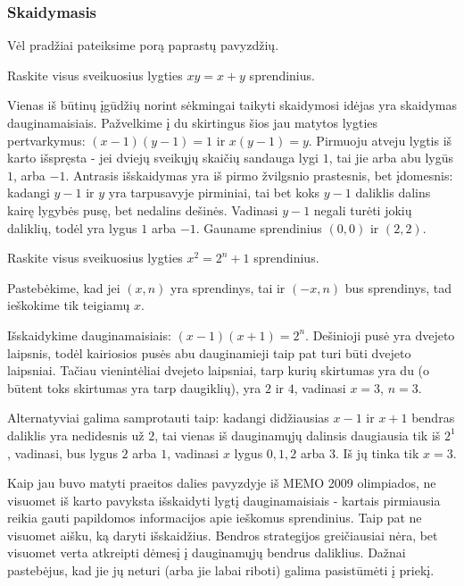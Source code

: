 \subsubsection{Skaidymasis}

Vėl pradžiai pateiksime porą paprastų pavyzdžių.

\begin{pav} Raskite visus sveikuosius lygties $xy = x + y$ sprendinius.
\end{pav}

\begin{sprendimas}
  Vienas iš būtinų įgūdžių norint sėkmingai taikyti skaidymosi idėjas
  yra skaidymas dauginamaisiais. Pažvelkime į du skirtingus šios jau
  matytos lygties
  pertvarkymus: $(x-1)(y-1) = 1$ ir $x(y-1) = y$. Pirmuoju atveju lygtis iš
  karto išspręsta - jei dviejų sveikųjų skaičių sandauga lygi $1$, tai jie
  arba abu lygūs $1$, arba $-1$. Antrasis išskaidymas yra iš pirmo žvilgsnio
  prastesnis, bet įdomesnis: kadangi $y-1$ ir $y$ yra tarpusavyje
  pirminiai, tai bet koks $y-1$ daliklis dalins kairę lygybės pusę, bet
  nedalins dešinės. Vadinasi $y-1$ negali turėti jokių daliklių, todėl
  yra lygus $1$ arba $-1$. Gauname sprendinius $(0, 0)$ ir $(2, 2)$.  
\end{sprendimas}

\begin{pav} Raskite visus sveikuosius lygties $x^2 = 2^n + 1$ sprendinius.
\end{pav}

\begin{sprendimas}
  Pastebėkime, kad jei $(x,n)$ yra sprendinys, tai ir $(-x,n)$ bus
  sprendinys, tad ieškokime tik teigiamų $x$.

  Išskaidykime dauginamaisiais: $(x-1)(x+1) = 2^n$. Dešinioji pusė yra
  dvejeto laipsnis, todėl kairiosios pusės abu dauginamieji taip pat turi
  būti dvejeto laipsniai. Tačiau vienintėliai dvejeto laipsniai, tarp kurių
  skirtumas yra du (o būtent toks skirtumas yra tarp daugiklių), yra
  $2$ ir $4$, vadinasi $x=3$, $n=3$.

  Alternatyviai galima samprotauti taip: kadangi didžiausias $x-1$ ir
  $x+1$ bendras daliklis yra nedidesnis už $2$, tai vienas iš dauginamųjų
  dalinsis daugiausia tik iš $2^1$, vadinasi, bus lygus $2$ arba $1$,
  vadinasi $x$ lygus $0, 1, 2$ arba $3$. Iš jų tinka tik $x=3$.
\end{sprendimas}

Kaip jau buvo matyti praeitos dalies pavyzdyje iš MEMO 2009 olimpiados,
ne visuomet iš karto pavyksta išskaidyti lygtį dauginamaisiais - kartais
pirmiausia reikia gauti papildomos informacijos apie ieškomus sprendinius.
Taip pat ne visuomet aišku, ką daryti išskaidžius. Bendros strategijos
greičiausiai nėra, bet visuomet verta atkreipti dėmesį į dauginamųjų bendrus
daliklius. Dažnai pastebėjus, kad jie jų neturi (arba jie labai riboti) galima
pasistūmėti į priekį. 


